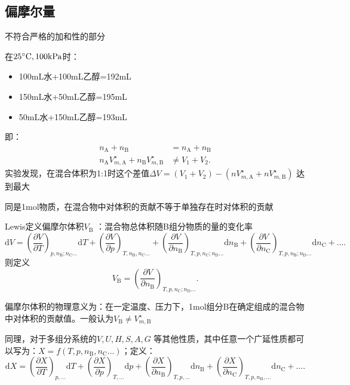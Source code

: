 \subsection{偏摩尔量}%
\label{sub:偏摩尔量}
不符合严格的加和性的部分
\begin{eg}
    在$25^\circ\text{C}, 100\ce{kPa}$时：
    \begin{itemize}
        \item 100mL水+100mL乙醇=192mL
        \item 150mL水+50mL乙醇=195mL
        \item 50mL水+150mL乙醇=193mL
    \end{itemize}
\end{eg}
即：
\begin{align*}
    n_\text{A}+n_\text{B} &= n_\text{A}+n_\text{B}\\
    n_\text{A}V^\star_{m,\text{A}} + n_\text{B}V^\star_{m,\text{B}} &\neq  V_1+V_2
.\end{align*}
实验发现，在混合体积为1:1时这个差值$\Delta V = \left( V_1+V_2 \right)-\left( nV^\star_{m,\text{A}}+nV^\star_{m,\text{B}} \right)$ 达到最大
\begin{notation}
    同是1mol物质，在混合物中对体积的贡献不等于单独存在时对体积的贡献
\end{notation}
Lewis定义偏摩尔体积$V_\text{B}$ ：混合物总体积随B组分物质的量的变化率\[
    \mathrm{d}V = \left(\frac{\partial V}{\partial T}\right)_{p,n_\text{B};n_\text{C}\ldots }\mathrm{d}T + \left(\frac{\partial V}{\partial p}\right)_{T,n_\text{B},n_\text{C}\ldots }+\left(\frac{\partial V}{\partial n_\text{B}}\right)_{T,p,n_\text{C};n_\text{D}\ldots }\mathrm{d}n_\text{B}+\left(\frac{\partial V}{\partial n_\text{C}}\right)_{T,p,n_\text{B};n_\text{D}\ldots }\mathrm{d}n_\text{C}+\ldots 
.\]
则定义\[\boxed{
    V_\text{B}=\left(\frac{\partial V}{\partial n_\text{B}}\right)_{T,p,n_\text{C};n_\text{D}\ldots }
.}\]
\begin{notation}
    偏摩尔体积的物理意义为：在一定温度、压力下，1mol组分B在确定组成的混合物中对体积的贡献值。一般认为$V_\text{B}\neq V^\star_{m,\text{B}}$
\end{notation}
同理，对于多组分系统的$V,U,H,S,A,G$ 等其他性质，其中任意一个广延性质都可以写为：$X = f\left( T,p,n_\text{B},n_\text{C}\ldots  \right)$；定义：\[
\mathrm{d}X = \left(\frac{\partial X}{\partial T}\right)_{p,\ldots }\mathrm{d}T+\left(\frac{\partial X}{\partial p}\right)_{T,\ldots }\mathrm{d}p+\left(\frac{\partial X}{\partial n_\text{B}}\right)_{T,p,\ldots }\mathrm{d}n_\text{B}+\left(\frac{\partial X}{\partial n_\text{C}}\right)_{T,p,n_\text{B},\ldots}\mathrm{d}n_\text{C}+\ldots 
.\]
